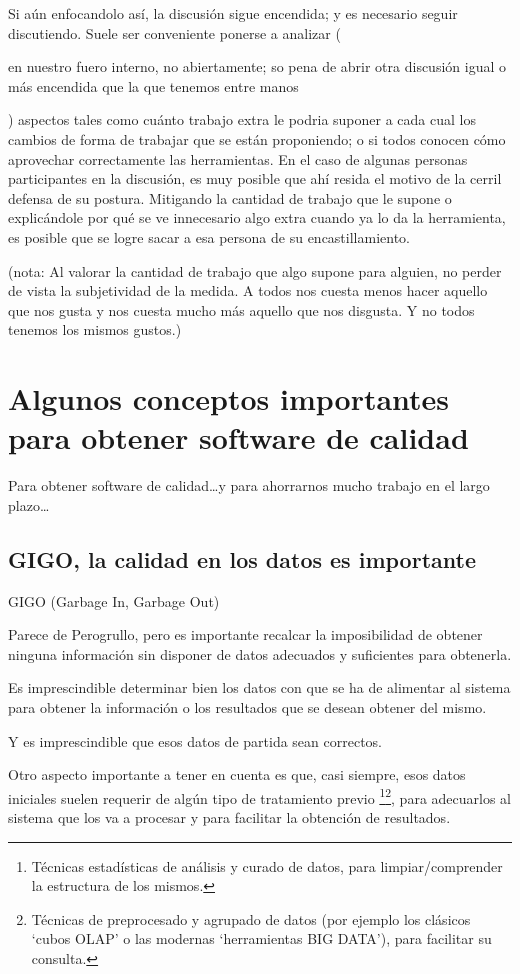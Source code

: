 \documentclass[spanish,12pt,a4paper,final,oneside]{book}
\begin{document}
Si aún enfocandolo así, la discusión sigue encendida; y es necesario seguir discutiendo. Suele ser conveniente ponerse a analizar (\begin{footnotesize}en nuestro fuero interno, no abiertamente; so pena de abrir otra discusión igual o más encendida que la que tenemos entre manos\end{footnotesize}) aspectos tales como cuánto trabajo extra le podria suponer a cada cual los cambios de forma de trabajar que se están proponiendo; o si todos conocen cómo aprovechar correctamente las herramientas. En el caso de algunas personas participantes en la discusión, es muy posible que ahí resida el motivo de la cerril defensa de su postura. Mitigando la cantidad de trabajo que le supone o explicándole por qué se ve innecesario algo extra cuando ya lo da la herramienta, es posible que se logre sacar a esa persona de su encastillamiento.

(nota: Al valorar la cantidad de trabajo que algo supone para alguien, no perder de vista la subjetividad de la medida. A todos nos cuesta menos hacer aquello que nos gusta y nos cuesta mucho más aquello que nos disgusta. Y no todos tenemos los mismos gustos.)

\chapter{Algunos conceptos importantes para obtener software de calidad}

Para obtener software de calidad\ldots y para ahorrarnos mucho trabajo en el largo plazo\ldots


\section{GIGO, la calidad en los datos es importante}
GIGO (Garbage In, Garbage Out)

Parece de Perogrullo, pero es importante recalcar la imposibilidad de obtener ninguna información sin disponer de datos adecuados y suficientes para obtenerla. 

Es imprescindible determinar bien los datos con que se ha de alimentar al sistema para obtener la información o los resultados que se desean obtener del mismo.

Y es imprescindible que esos datos de partida sean correctos.

\vspace{1cm}

Otro aspecto importante a tener en cuenta es que, casi siempre, esos datos iniciales suelen requerir de algún tipo de tratamiento previo \footnote{Técnicas estadísticas de análisis y curado de datos, para limpiar/comprender la estructura de los mismos.}\footnote{Técnicas de preprocesado y agrupado de datos (por ejemplo los clásicos `cubos OLAP' o las modernas `herramientas BIG DATA'), para facilitar su consulta.}, para adecuarlos al sistema que los va a procesar y para facilitar la obtención de resultados.
\end{document}
